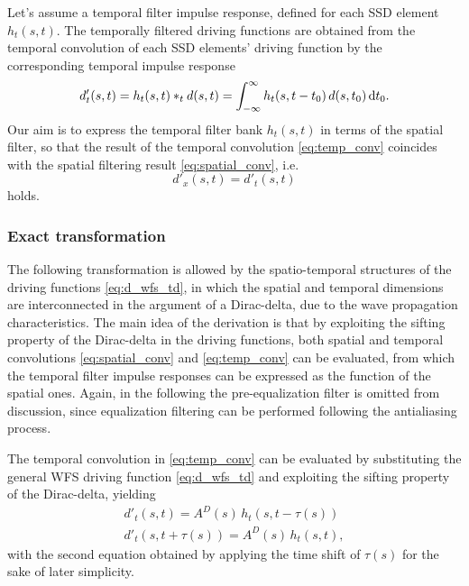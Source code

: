 \documentclass[conference]{IEEEtran}
\begin{document}
Let's assume a temporal filter impulse response, defined for each SSD element $h_t(s,t)$.
The temporally filtered driving functions are obtained from the temporal convolution of each SSD elements' driving function by the corresponding temporal impulse response
\begin{equation}
    d'_t(s,t) = h_t(s,t) \ast_t d(s,t) = \int_{-\infty}^{\infty} h_t(s,t-t_0) \, d(s,t_0) \, \td t_0.
    \label{eq:temp_conv}
\end{equation}
Our aim is to express the temporal filter bank $h_t(s,t)$ in terms of the spatial filter, so that the result of the temporal convolution \eqref{eq:temp_conv} coincides with the spatial filtering result \eqref{eq:spatial_conv}, i.e.
\begin{equation}
    d'_x(s,t) = d'_t(s,t)
\end{equation}
holds.

\subsubsection{Exact transformation}
The following transformation is allowed by the spatio-temporal structures of the driving functions \eqref{eq:d_wfs_td}, in which the spatial and temporal dimensions are interconnected in the argument of a Dirac-delta, due to the wave propagation characteristics.
The main idea of the derivation is that by exploiting the sifting property of the Dirac-delta in the driving functions, both spatial and temporal convolutions \eqref{eq:spatial_conv} and \eqref{eq:temp_conv} can be evaluated, from which the temporal filter impulse responses can be expressed as the function of the spatial ones.
Again, in the following the pre-equalization filter is omitted from discussion, since equalization filtering can be performed following the antialiasing process.

The temporal convolution in \eqref{eq:temp_conv} can be evaluated by substituting the general WFS driving function \eqref{eq:d_wfs_td} and exploiting the sifting property of the Dirac-delta, yielding
\begin{align}
    d'_t(s,t) = A^D(s) \, h_t \!\left(s,t- \tau(s) \right) \\
    d'_t(s,t + \tau(s) ) = A^D(s) \, h_t \!\left(s,t\right),
    \label{eq:temp_conv_eval}
\end{align}
with the second equation obtained by applying the time shift of $\tau(s)$ for the sake of later simplicity.
\end{document}

